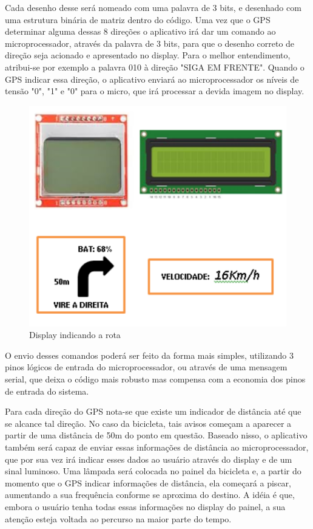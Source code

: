 	Cada desenho desse será nomeado com uma palavra de 3 bits, e desenhado com uma estrutura binária de matriz dentro do código. Uma vez que o GPS determinar alguma dessas 8 direções o aplicativo irá dar um comando ao microprocessador, através da palavra de 3 bits, para que o desenho correto de direção seja acionado e apresentado no display. 
	Para o melhor entendimento, atribui-se por exemplo a palavra 010 à direção "SIGA EM FRENTE". Quando o GPS indicar essa direção, o aplicativo enviará ao microprocessador os níveis de tensão "0", "1" e "0" para o micro, que irá processar a devida imagem no display.
	\newpage
	
		\graphicspath{{figuras/}}
		\begin{figure}[h!]
			\centering
			\includegraphics[scale=0.80]{Figura11_display_indicando_a_rota.PNG}
			\caption{Display indicando a rota}
			\label{img:display_indicando_a_rota}
		\end{figure}



	O envio desses comandos poderá ser feito da forma mais simples, utilizando 3 pinos lógicos de entrada do microprocessador, ou através de uma mensagem serial, que deixa o código mais robusto mas compensa com a economia dos pinos de entrada do sistema.
	
	Para cada direção do GPS nota-se que existe um indicador de distância até que se alcance tal direção. No caso da bicicleta, tais avisos começam a aparecer a partir de uma distância de 50m do ponto em questão. Baseado nisso, o aplicativo também será capaz de enviar essas informações de distância ao microprocessador, que por sua vez irá indicar esses dados ao usuário através do display e de um sinal luminoso.
	Uma lâmpada será colocada no painel da bicicleta e, a partir do momento que o GPS indicar informações de distância, ela começará a piscar, aumentando a sua frequência conforme se aproxima do destino. A idéia é que, embora o usuário tenha todas essas informações no display do painel, a sua atenção esteja voltada ao percurso na maior parte do tempo.
	

